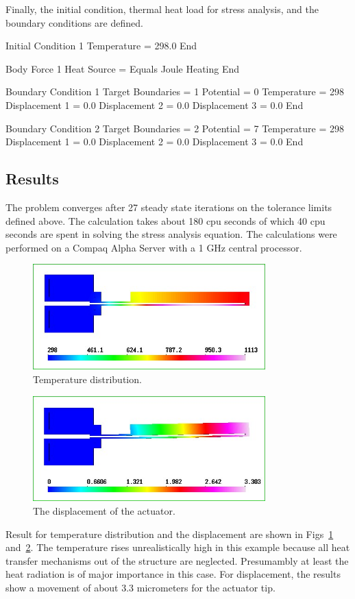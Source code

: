 Finally, the initial condition, thermal heat load for stress analysis,
and the boundary conditions are defined.

\ttbegin
Initial Condition 1
   Temperature = 298.0
End

Body Force 1
  Heat Source = Equals Joule Heating
End

Boundary Condition 1
  Target Boundaries = 1
  Potential = 0
  Temperature = 298
  Displacement 1 = 0.0
  Displacement 2 = 0.0
  Displacement 3 = 0.0
End

Boundary Condition 2
  Target Boundaries = 2
  Potential = 7
  Temperature = 298
  Displacement 1 = 0.0
  Displacement 2 = 0.0
  Displacement 3 = 0.0
End
\ttend

\subsection*{Results}

The problem converges after 27 steady state iterations on the
tolerance limits defined above. The calculation takes about 180 cpu
seconds of which 40 cpu seconds are spent in solving the stress analysis
equation. The calculations were performed on a Compaq Alpha Server
with a 1 GHz central processor.

\begin{figure}[tbhp]
  \centerline{\includegraphics[width=0.8\textwidth]{temp_wh}}
  \caption{Temperature distribution.} 
  \label{temp_thermal}
\end{figure}
\begin{figure}[h]
  \centerline{\includegraphics[width=0.8\textwidth]{displ_wh}}
  \caption{The displacement of the actuator.} 
  \label{displ_thermal}
\end{figure}

Result for temperature distribution and the displacement are shown in
Figs~\ref{temp_thermal} and~\ref{displ_thermal}. The temperature rises
unrealistically high in this example because all heat transfer
mechanisms out of the structure are neglected. Presumambly at least
the heat radiation is of major importance in this case. For
displacement, the results show a movement of about 3.3 micrometers for
the actuator tip.

\vfill
\mbox{}
